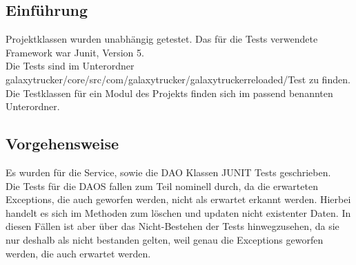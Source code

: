 \documentclass[fontsize=12pt,paper=a4,twoside]{scrartcl}
\begin{document}
\subsection{Einführung}
Projektklassen wurden unabhängig getestet. Das für die Tests verwendete Framework war Junit, Version 5. \\
Die Tests sind im Unterordner galaxytrucker/core/src/com/galaxytrucker/galaxytruckerreloaded/Test zu finden. Die Testklassen für ein Modul des Projekts finden sich im passend benannten Unterordner. \\
\subsection{Vorgehensweise}
Es wurden für die Service, sowie die DAO Klassen JUNIT Tests geschrieben. \\
Die Tests für die DAOS fallen zum Teil nominell durch, da die erwarteten Exceptions, die auch geworfen werden, nicht als erwartet erkannt werden. Hierbei handelt es sich im Methoden zum löschen und updaten nicht existenter Daten. In diesen Fällen ist aber über das Nicht-Bestehen der Tests hinwegzusehen, da sie nur deshalb als nicht bestanden gelten, weil genau die Exceptions geworfen werden, die auch erwartet werden. \\
\end{document}
